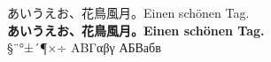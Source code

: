 \documentclass{jarticle}
\begin{document}
\parindent0mm
\pagestyle{empty}
あいうえお、花鳥風月。Einen schönen Tag.\\
{\bfseries あいうえお、花鳥風月。Einen schönen Tag.}\\
§¨°±´¶×÷ ΑΒΓαβγ АБВабв
\end{document}
